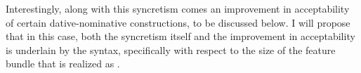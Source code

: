 \documentclass[output=paper]{langscibook}
\begin{document}
Interestingly, along with this syncretism comes an improvement in acceptability of certain dative-nominative constructions, to be discussed below. I will propose that in this case, both the syncretism itself and the improvement in acceptability is underlain by the syntax, specifically with respect to the size of the feature bundle that is realized as \stin. %







%




\end{document}

